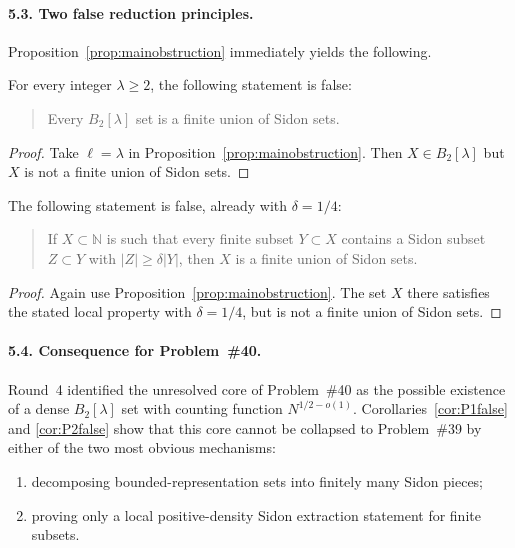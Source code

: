 \paragraph{5.3. Two false reduction principles.}
Proposition~\ref{prop:mainobstruction} immediately yields the following.

\begin{corollary}\label{cor:P1false}
For every integer $\lambda\ge 2$, the following statement is false:
\begin{quote}
Every $B_2[\lambda]$ set is a finite union of Sidon sets.
\end{quote}
\end{corollary}

\begin{proof}
Take $\ell=\lambda$ in Proposition~\ref{prop:mainobstruction}. Then $X\in B_2[\lambda]$ but
$X$ is not a finite union of Sidon sets.
\end{proof}

\begin{corollary}\label{cor:P2false}
The following statement is false, already with $\delta=1/4$:
\begin{quote}
If $X\subset\mathbb N$ is such that every finite subset $Y\subset X$ contains a Sidon subset
$Z\subset Y$ with $|Z|\ge \delta |Y|$, then $X$ is a finite union of Sidon sets.
\end{quote}
\end{corollary}

\begin{proof}
Again use Proposition~\ref{prop:mainobstruction}. The set $X$ there satisfies the stated local
property with $\delta=1/4$, but is not a finite union of Sidon sets.
\end{proof}

\paragraph{5.4. Consequence for Problem~\#40.}
Round~4 identified the unresolved core of Problem~\#40 as the possible existence of a dense
$B_2[\lambda]$ set with counting function $N^{1/2-o(1)}$. Corollaries~\ref{cor:P1false} and
\ref{cor:P2false} show that this core cannot be collapsed to Problem~\#39 by either of the two
most obvious mechanisms:
\begin{enumerate}
\item[(i)] decomposing bounded-representation sets into finitely many Sidon pieces;
\item[(ii)] proving only a local positive-density Sidon extraction statement for finite subsets.
\end{enumerate}

